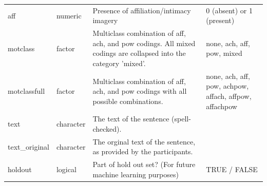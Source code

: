 \documentclass[jou,a4paper]{apa6}\usepackage[]{graphicx}\usepackage[]{color}
\begin{document}
\begin{table}
\begin{threeparttable}
\begin{tabularx}{\textwidth}{llXX}
  aff & numeric & Presence of affiliation/intimacy imagery & 0 (absent) or 1 (present) \\ 
  motclass & factor & Multiclass combination of aff, ach, and pow codings. All mixed codings are collapsed into the category 'mixed'. & none, ach, aff, pow, mixed \\ 
  motclassfull & factor & Multiclass combination of aff, ach, and pow codings with all possible combinations. & none, ach, aff, pow, achpow, affach, affpow, affachpow \\ 
  text & character & The text of the sentence (spell-checked). &  \\ 
  text\_original & character & The orginal text of the sentence, as provided by the participants. &  \\ 
  holdout & logical & Part of hold out set? (For future machine learning purposes) & TRUE / FALSE \\ 
   \hline

		\bottomrule
		\end{tabularx}
\end{threeparttable}
\end{table}
\end{document}
